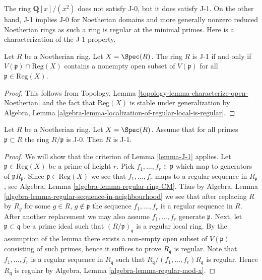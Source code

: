 \noindent
The ring $\mathbf{Q}[x]/(x^2)$ does not satisfy J-0, but it does satisfy J-1.
On the other hand, J-1 implies J-0 for Noetherian domains and more generally
nonzero reduced Noetherian rings as such a ring is regular at the minimal
primes. Here is a characterization of the J-1 property.

\begin{lemma}
\label{lemma-J-1}
Let $R$ be a Noetherian ring. Let $X = \Spec(R)$.
The ring $R$ is J-1 if and only if $V(\mathfrak p) \cap \text{Reg}(X)$
contains a nonempty open subset of $V(\mathfrak p)$ for all
$\mathfrak p \in \text{Reg}(X)$.
\end{lemma}

\begin{proof}
This follows from
Topology, Lemma \ref{topology-lemma-characterize-open-Noetherian}
and the fact that $\text{Reg}(X)$ is stable under generalization by
Algebra, Lemma \ref{algebra-lemma-localization-of-regular-local-is-regular}.
\end{proof}

\begin{lemma}
\label{lemma-intersection-regular-with-closed}
Let $R$ be a Noetherian ring. Let $X = \Spec(R)$. Assume that for all primes
$\mathfrak p \subset R$ the ring $R/\mathfrak p$ is J-0.
Then $R$ is J-1.
\end{lemma}

\begin{proof}
We will show that the criterion of Lemma \ref{lemma-J-1} applies.
Let $\mathfrak p \in \text{Reg}(X)$ be a prime of height $r$.
Pick $f_1, \ldots, f_r \in \mathfrak p$ which map to generators
of $\mathfrak pR_\mathfrak p$. Since $\mathfrak p \in \text{Reg}(X)$
we see that $f_1, \ldots, f_r$ maps to a regular sequence in $R_\mathfrak p$,
see Algebra, Lemma \ref{algebra-lemma-regular-ring-CM}. Thus by
Algebra, Lemma \ref{algebra-lemma-regular-sequence-in-neighbourhood}
we see that after replacing $R$ by $R_g$ for some $g \in R$,
$g \not \in \mathfrak p$ the sequence $f_1, \ldots, f_r$ is a
regular sequence in $R$. After another replacement we may also
assume $f_1, \ldots, f_r$ generate $\mathfrak p$.
Next, let $\mathfrak p \subset \mathfrak q$
be a prime ideal such that $(R/\mathfrak p)_\mathfrak q$ is
a regular local ring. By the assumption of the lemma there
exists a non-empty open subset of $V(\mathfrak p)$ consisting
of such primes, hence it suffices to prove $R_\mathfrak q$ is regular.
Note that $f_1, \ldots, f_r$ is a regular sequence in $R_\mathfrak q$
such that $R_\mathfrak q/(f_1, \ldots, f_r)R_\mathfrak q$ is regular.
Hence $R_\mathfrak q$ is regular by
Algebra, Lemma \ref{algebra-lemma-regular-mod-x}.
\end{proof}

